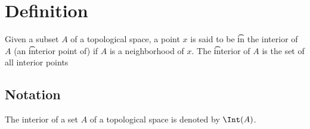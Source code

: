 
\section*{Definition}

Given a subset $A$ of a topological space, a point $x$ is said to be \t{in the interior of} $A$ (an \t{interior point of}) if $A$ is a neighborhood of $x$.
The \t{interior} of $A$ is the set of all interior points

\subsection*{Notation}

The interior of a set $A$ of a topological space is denoted by $\Int(A)$.

\blankpage